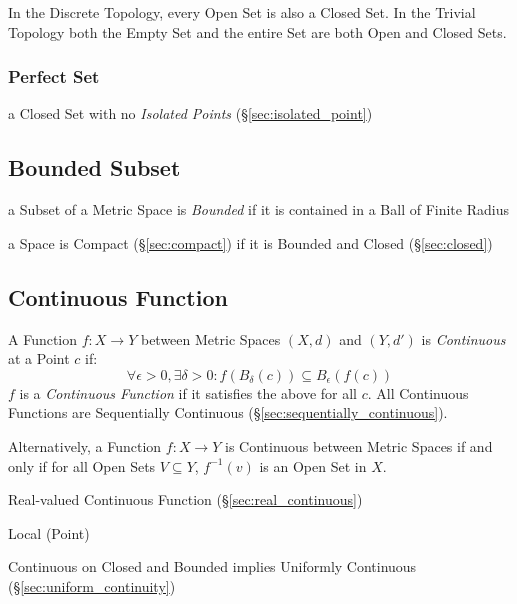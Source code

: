 In the Discrete Topology, every Open Set is also a Closed Set. In the
Trivial Topology both the Empty Set and the entire Set are both Open
and Closed Sets.



\subsubsection{Perfect Set}\label{sec:perfect_set}

a Closed Set with no \emph{Isolated Points}
(\S\ref{sec:isolated_point})



\subsection{Bounded Subset}\label{sec:bounded_subset}

a Subset of a Metric Space is \emph{Bounded} if it is contained in a Ball of
Finite Radius

a Space is Compact (\S\ref{sec:compact}) if it is Bounded and Closed
(\S\ref{sec:closed})



\subsection{Continuous Function}\label{sec:continuous_function}

A Function $f : X \rightarrow Y$ between Metric Spaces $(X,d)$ and
$(Y,d')$ is \emph{Continuous} at a Point $c$ if:
\[
  \forall \epsilon > 0, \exists \delta > 0 :
  f (B_{\delta}(c)) \subseteq B_{\epsilon}(f(c))
\]
$f$ is a \emph{Continuous Function} if it satisfies the above for all
$c$. All Continuous Functions are Sequentially Continuous
(\S\ref{sec:sequentially_continuous}).

Alternatively, a Function $f: X \rightarrow Y$ is Continuous between
Metric Spaces if and only if for all Open Sets $V \subseteq Y$,
$f^{-1}(v)$ is an Open Set in $X$.

Real-valued Continuous Function (\S\ref{sec:real_continuous})

Local (Point)

Continuous on Closed and Bounded implies Uniformly Continuous
(\S\ref{sec:uniform_continuity})



